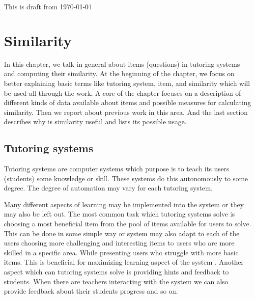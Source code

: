 \documentclass[
  digital, %
  table,   %
  nolof,     %
  nolot,     %
  nocover,
  color,
  final, %
]{fithesis3}
\begin{document}
This is draft from \today %


\chapter{Similarity}


In this chapter, we talk in general about items (questions) in tutoring systems and computing their similarity. At the beginning of the chapter, we focus on better explaining basic terms like tutoring system, item, and similarity which will be used all through the work. A core of the chapter focuses on a description of different kinds of data available about items and possible measures for calculating similarity. Then we report about previous work in this area. And the last section describes why is similarity useful and lists its possible usage.


\section{Tutoring systems}\label{tutoring-systems}

Tutoring systems are computer systems which purpose is to teach its users (students) some knowledge or skill. These systems do this autonomously to some degree. The degree of automation may vary for each tutoring system.


Many different aspects of learning may be implemented into the system or they may also be left out. The most common task which tutoring systems solve is choosing a most beneficial item from the pool of items available for users to solve. This can be done in some simple way or system may also adapt to each of the users choosing more challenging and interesting items to users who are more skilled in a specific area. While presenting users who struggle with more basic items. This is beneficial for maximizing learning aspect of the system \cite{papouvsek2015impact}. Another aspect which can tutoring systems solve is providing hints and feedback to students. When there are teachers interacting with the system we can also provide feedback about their students progress and so on.

\end{document}
